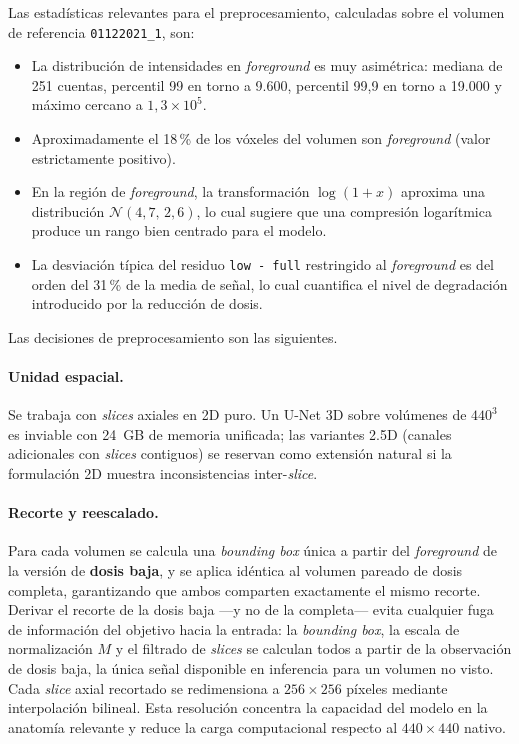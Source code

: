 Las estadísticas relevantes para el preprocesamiento, calculadas
sobre el volumen de referencia \texttt{01122021\_1}, son:

\begin{itemize}[leftmargin=*]
    \item La distribución de intensidades en \textit{foreground}
    es muy asimétrica: mediana de 251 cuentas, percentil 99 en
    torno a 9.600, percentil 99,9 en torno a 19.000 y máximo
    cercano a $1{,}3 \times 10^{5}$.
    \item Aproximadamente el 18\,\% de los vóxeles del volumen
    son \textit{foreground} (valor estrictamente positivo).
    \item En la región de \textit{foreground}, la transformación
    $\log(1+x)$ aproxima una distribución $\mathcal{N}(4{,}7,\,
    2{,}6)$, lo cual sugiere que una compresión logarítmica
    produce un rango bien centrado para el modelo.
    \item La desviación típica del residuo
    \texttt{low\,-\,full} restringido al \textit{foreground} es
    del orden del 31\,\% de la media de señal, lo cual
    cuantifica el nivel de degradación introducido por la
    reducción de dosis.
\end{itemize}

Las decisiones de preprocesamiento son las siguientes.

\paragraph{Unidad espacial.}
Se trabaja con \textit{slices} axiales en 2D puro. Un U-Net 3D
sobre volúmenes de $440^3$ es inviable con 24~GB de memoria
unificada; las variantes 2.5D (canales adicionales con
\textit{slices} contiguos) se reservan como extensión natural si
la formulación 2D muestra inconsistencias inter-\textit{slice}.

\paragraph{Recorte y reescalado.}
Para cada volumen se calcula una \textit{bounding box} única a
partir del \textit{foreground} de la versión de \textbf{dosis
baja}, y se aplica idéntica al volumen pareado de dosis completa,
garantizando que ambos comparten exactamente el mismo recorte.
Derivar el recorte de la dosis baja —y no de la completa— evita
cualquier fuga de información del objetivo hacia la entrada: la
\textit{bounding box}, la escala de normalización $M$ y el filtrado
de \textit{slices} se calculan todos a partir de la observación de
dosis baja, la única señal disponible en inferencia para un
volumen no visto. Cada
\textit{slice} axial recortado se redimensiona a $256 \times 256$
píxeles mediante interpolación bilineal. Esta resolución
concentra la capacidad del modelo en la anatomía relevante y
reduce la carga computacional respecto al $440 \times 440$ nativo.

